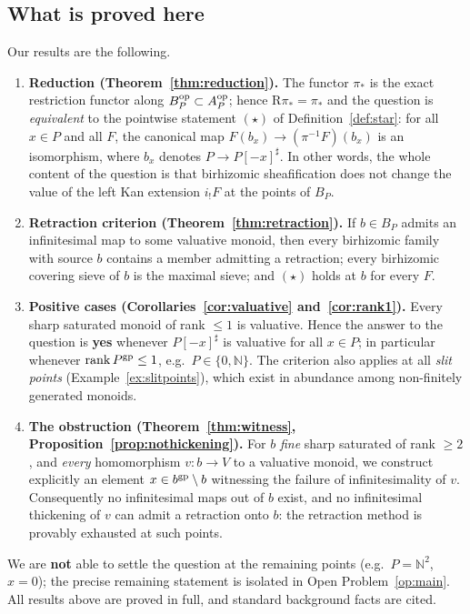 \documentclass[11pt]{amsart}
\theoremstyle{plain}
\theoremstyle{remark}
\theoremstyle{definition}
\numberwithin{equation}{section}
\begin{document}
\subsection{What is proved here}
Our results are the following.
\begin{enumerate}
\item \textbf{Reduction (Theorem~\ref{thm:reduction}).}  The functor
$\pi_*$ is the exact restriction functor along
$B_P^{\rm op}\subset A_P^{\rm op}$; hence $\mathrm R\pi_*=\pi_*$ and the
question is \emph{equivalent} to the pointwise statement $(\star)$ of
Definition~\ref{def:star}: for all $x\in P$ and all $F$, the canonical map
$F(b_x)\to(\pi^{-1}F)(b_x)$ is an isomorphism, where $b_x$ denotes
$P\to P[-x]^\sharp$.  In other words, the whole content of the question is
that birhizomic sheafification does not change the value of the left Kan
extension $i_!F$ at the points of $B_P$.
\item \textbf{Retraction criterion (Theorem~\ref{thm:retraction}).}  If
$b\in B_P$ admits an infinitesimal map to some valuative monoid, then every
birhizomic family with source $b$ contains a member admitting a retraction;
every birhizomic covering sieve of $b$ is the maximal sieve; and $(\star)$
holds at $b$ for every $F$.
\item \textbf{Positive cases (Corollaries~\ref{cor:valuative}
and~\ref{cor:rank1}).}  Every sharp saturated monoid of rank $\le 1$ is
valuative.  Hence the answer to the question is \textbf{yes} whenever
$P[-x]^\sharp$ is valuative for all $x\in P$; in particular whenever
$\operatorname{rank}P^{\rm gp}\le 1$, e.g.\ $P\in\{0,\mathbb N\}$.  The
criterion also applies at all \emph{slit points}
(Example~\ref{ex:slitpoints}), which exist in abundance among non-finitely
generated monoids.
\item \textbf{The obstruction (Theorem~\ref{thm:witness},
Proposition~\ref{prop:nothickening}).}  For $b$ \emph{fine} sharp
saturated of rank $\ge 2$, and \emph{every} homomorphism $v\colon b\to V$
to a valuative monoid, we construct explicitly an element
$x\in b^{\rm gp}\setminus b$ witnessing the failure of infinitesimality
of $v$.  Consequently no infinitesimal maps out of $b$ exist, and no
infinitesimal thickening of $v$ can admit a retraction onto $b$: the
retraction method is provably exhausted at such points.
\end{enumerate}
We are \textbf{not} able to settle the question at the remaining points
(e.g.\ $P=\mathbb N^2$, $x=0$); the precise remaining statement is
isolated in Open Problem~\ref{op:main}.  All results above are proved in
full, and standard background facts are cited.
\end{document}
